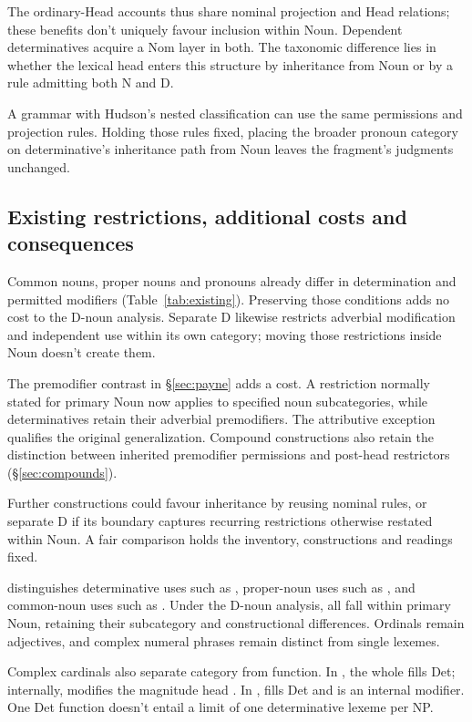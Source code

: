 \documentclass[12pt]{article}
\begin{document}
The ordinary-Head accounts thus share nominal projection and Head relations; these benefits don't uniquely favour inclusion within Noun. Dependent determinatives acquire a Nom layer in both. The taxonomic difference lies in whether the lexical head enters this structure by inheritance from Noun or by a rule admitting both N and D.

A grammar with Hudson's nested classification can use the same permissions and projection rules. Holding those rules fixed, placing the broader pronoun category on determinative's inheritance path from Noun leaves the fragment's judgments unchanged.

\subsection{Existing restrictions, additional costs and consequences}\label{sec:costs}

Common nouns, proper nouns and pronouns already differ in determination and permitted modifiers (Table~\ref{tab:existing}). Preserving those conditions adds no cost to the D-noun analysis. Separate D likewise restricts adverbial modification and independent use within its own category; moving those restrictions inside Noun doesn't create them.

The premodifier contrast in §\ref{sec:payne} adds a cost. A restriction normally stated for primary Noun now applies to specified noun subcategories, while determinatives retain their adverbial premodifiers. The attributive  exception qualifies the original generalization. Compound constructions also retain the distinction between inherited premodifier permissions and post-head restrictors (§\ref{sec:compounds}).

Further constructions could favour inheritance by reusing nominal rules, or separate D if its boundary captures recurring restrictions otherwise restated within Noun. A fair comparison holds the inventory, constructions and readings fixed.

\textcite{reynolds2026numerals} distinguishes determinative uses such as , proper-noun uses such as , and common-noun uses such as . Under the D-noun analysis, all fall within primary Noun, retaining their subcategory and constructional differences. Ordinals remain adjectives, and complex numeral phrases remain distinct from single lexemes.

Complex cardinals also separate category from function. In , the whole  fills Det; internally,  modifies the magnitude head  \citep[§4]{reynolds2026numerals}. In ,  fills Det and  is an internal modifier. One Det function doesn't entail a limit of one determinative lexeme per NP.
\end{document}

